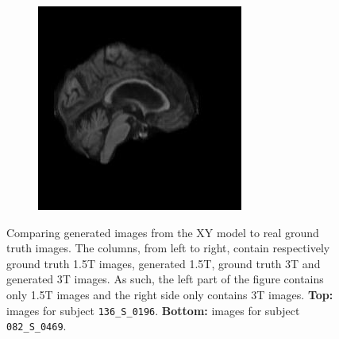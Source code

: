 \documentclass[12pt, fleqn, titlepage]{article}
\newcommand\skipperer{0.45pt}
\newcommand{\1}[1]{\mathds{1}\left[#1\right]}
\begin{document}
\begin{figure}[H]
\begin{subfigure}[b]{0.7\textwidth}
		\hskip\skipperer
		\includegraphics[width=0.22\linewidth]{imgs/082_S_0469/XY_model_082_S_0469_yz_3}
	\end{subfigure}
	\caption{Comparing generated images from the XY model to real ground truth images. The columns, from left to right, contain respectively ground truth 1.5T images, generated 1.5T, ground truth 3T and generated 3T images. As such, the left part of the figure contains only 1.5T images and the right side only contains 3T images. \textbf{Top:} images for subject \texttt{136\_S\_0196}. \textbf{Bottom:} images for subject \texttt{082\_S\_0469}.}
	\label{fig:xy_quality_comparison}
\end{figure}
\end{document}
